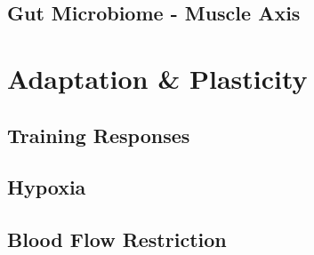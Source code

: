 \subsection{Gut Microbiome - Muscle Axis}

\section{Adaptation \& Plasticity}

\subsection{Training Responses}

\subsection{Hypoxia}

\subsection{Blood Flow Restriction}

\printbibliography[heading=subbibintoc]
